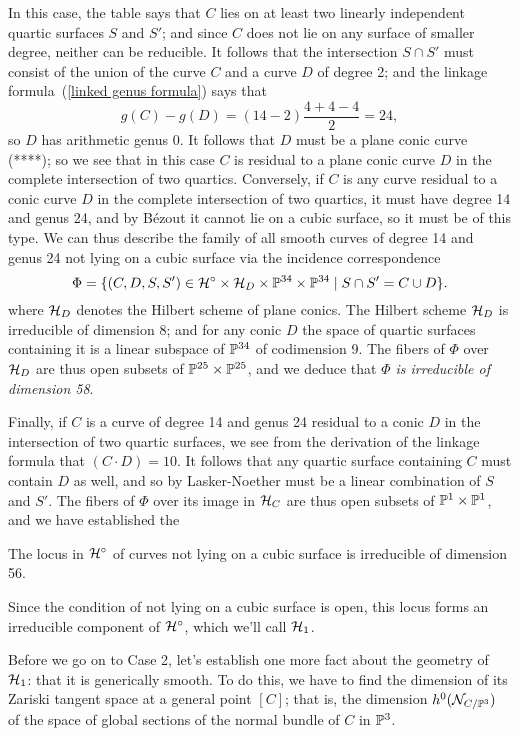 In this case, the table says that $C$ lies on at least two linearly independent quartic surfaces $S$ and $S'$; and since $C$ does not lie on any surface of smaller degree, neither can be reducible. It follows that the intersection $S \cap S'$ must consist of the union of the curve $C$ and a curve $D$ of degree 2; and the linkage formula~(\ref{linked genus formula}) says that
$$
g(C) - g(D) = (14 - 2)\frac{4+4-4}{2} = 24,
$$
so $D$ has arithmetic genus 0. It follows that $D$ must be a plane conic curve (****); so we see that in this case $C$ is residual to a plane conic curve $D$ in the complete intersection of two quartics. Conversely, if $C$ is any curve residual to a conic curve $D$ in the complete intersection of two quartics, it must have degree 14 and genus 24, and by B\'ezout it cannot lie on a cubic surface, so it must be of this type. We can thus describe the family of all smooth curves of degree 14 and genus 24 not lying on a cubic surface via the incidence correspondence
$$
\Phi = \{ (C, D, S, S') \in \cH^\circ \times \cH_D \times \PP^{34} \times \PP^{34} \mid S \cap S' = C \cup D\}.
$$
where $\cH_D$ denotes the Hilbert scheme of plane conics. The Hilbert scheme $\cH_D$ is irreducible of dimension 8; and for any conic $D$ the space of quartic surfaces containing it is a linear subspace of $\PP^{34}$ of codimension 9. The fibers of $\Phi$ over $\cH_D$ are thus open subsets of $\PP^{25} \times \PP^{25}$, and we deduce that \emph{$\Phi$ is irreducible of dimension 58}. 

Finally, if $C$ is a curve of degree 14 and genus 24 residual to a conic $D$ in the intersection of two quartic surfaces, we see from the derivation of the linkage formula that $(C\cdot D) = 10$. It follows that any quartic surface containing $C$ must contain $D$ as well, and so by Lasker-Noether must be a linear combination of $S$ and $S'$. The fibers of $\Phi$ over its image in $\cH_C$ are thus open subsets of $\PP^1 \times \PP^1$, and we have established the

\begin{proposition}
The locus in $\cH^\circ$ of curves not lying on a cubic surface is irreducible of dimension 56.
\end{proposition} 

Since the condition of not lying on a cubic surface is open, this locus forms an irreducible component of $\cH^\circ$, which we'll call $\cH_1$.

Before we go on to Case 2, let's establish one more fact about the geometry of $\cH_1$: that it is generically smooth. To do this, we have to find the dimension of its Zariski tangent space at a general point $[C]$; that is, the dimension $h^0(\cN_{C/\PP^3})$ of the space of global sections of the normal bundle of $C$ in $\PP^3$.

